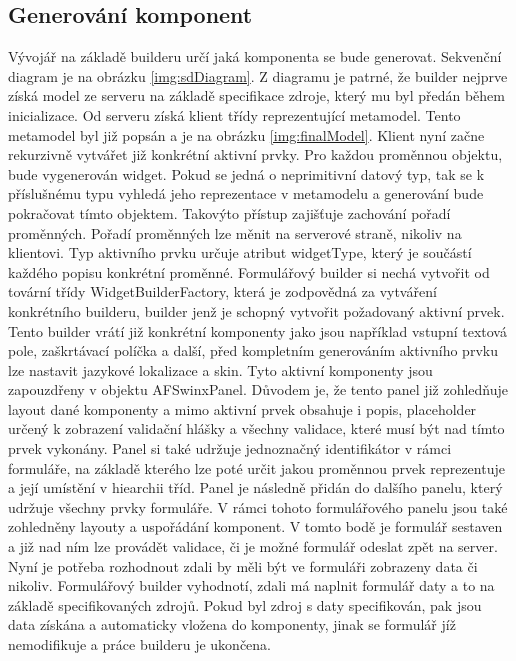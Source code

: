 \subsection{Generování komponent}
Vývojář na základě builderu určí jaká komponenta se bude generovat. Sekvenční diagram je na obrázku \ref{img:sdDiagram}. Z diagramu je patrné, že builder nejprve získá model ze serveru na základě specifikace zdroje, který mu byl předán během inicializace. Od serveru získá klient třídy reprezentující metamodel. Tento metamodel byl již popsán a je na obrázku \ref{img:finalModel}. Klient nyní začne rekurzivně vytvářet již konkrétní aktivní prvky. Pro každou proměnnou objektu, bude vygenerován widget. Pokud se jedná o neprimitivní datový typ, tak se k příslušnému typu vyhledá jeho reprezentace v metamodelu a generování bude pokračovat tímto objektem. Takovýto přístup zajišťuje zachování pořadí proměnných. Pořadí proměnných lze měnit na serverové straně, nikoliv na klientovi. Typ aktivního prvku určuje atribut widgetType, který je součástí každého popisu konkrétní proměnné. Formulářový builder si nechá vytvořit od tovární třídy WidgetBuilderFactory, která je zodpovědná za vytváření konkrétního builderu, builder jenž je schopný vytvořit požadovaný aktivní prvek. Tento builder vrátí již konkrétní komponenty jako jsou například vstupní textová pole, zaškrtávací políčka a další, před kompletním generováním aktivního prvku lze nastavit jazykové lokalizace a skin. Tyto aktivní komponenty jsou zapouzdřeny v objektu AFSwinxPanel. Důvodem je, že tento panel již zohledňuje layout dané komponenty a mimo aktivní prvek obsahuje i popis, placeholder určený k zobrazení validační hlášky a všechny validace, které musí být nad tímto prvek vykonány. Panel si také udržuje jednoznačný identifikátor v rámci formuláře, na základě kterého lze poté určit jakou proměnnou prvek reprezentuje a její umístění v hiearchii tříd. Panel je následně přidán do dalšího panelu, který udržuje všechny prvky formuláře. V rámci tohoto formulářového panelu jsou také zohledněny layouty a uspořádání komponent. V tomto bodě je formulář sestaven a již nad ním lze provádět validace, či je možné formulář odeslat zpět na server. Nyní je potřeba rozhodnout zdali by měli být ve formuláři zobrazeny data či nikoliv. Formulářový builder vyhodnotí, zdali má naplnit formulář daty a to na základě specifikovaných zdrojů. Pokud byl zdroj s daty specifikován, pak jsou data získána a automaticky vložena do komponenty, jinak se formulář jíž nemodifikuje a práce builderu je ukončena.

